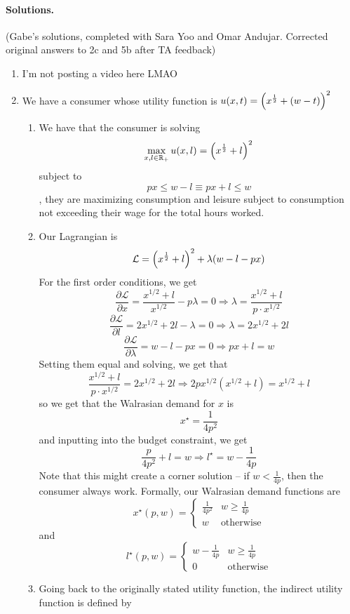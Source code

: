 \documentclass[12pt]{article}
\begin{document}
\paragraph{Solutions.} (Gabe's solutions, completed with Sara Yoo and Omar Andujar. Corrected original answers to 2c and 5b after TA feedback)
\begin{enumerate}
	\item I'm not posting a video here LMAO
	\item We have a consumer whose utility function is $u(x,t) = \left( x^{\frac{1}{2}} + (w - t)\right)^2$
	\begin{enumerate}
		\item We have that the consumer is solving
		\[
		\max_{x,l \in \mathbb{R}_{+}} u(x,l) = \left( x^{\frac{1}{2}} + l\right)^2
		\]
		subject to
		\[
		px \le w - l \equiv px + l \le w
		\]
		\ie, they are maximizing consumption and leisure subject to consumption not exceeding their wage for the total hours worked.
		\item Our Lagrangian is
		\[
		\mathcal{L} = \left( x^{\frac{1}{2}} + l\right)^2 + \lambda(w - l - px)
		\]
		For the first order conditions, we get
		\[
		\frac{\partial \mathcal{L}}{\partial x} = \frac{x^{1/2} + l}{x^{1/2}} - p\lambda = 0 \Longrightarrow \lambda = \frac{x^{1/2} + l}{p\cdot x^{1/2}}
		\]
		\[
		\frac{\partial \mathcal{L}}{\partial l} = 2x^{1/2} + 2l - \lambda = 0 \Longrightarrow \lambda = 2x^{1/2} + 2l
		\]
		\[
		\frac{\partial \mathcal{L}}{\partial \lambda} = w - l - px = 0 \Longrightarrow  px+ l = w
		\]
		Setting them equal and solving, we get that
		\[
		\frac{x^{1/2} + l}{p\cdot x^{1/2}} = 2x^{1/2} + 2l \Longrightarrow 2px^{1/2}(x^{1/2} + l) = x^{1/2} + l
		\]
		so we get that the Walrasian demand for $x$ is
		\[
		x^\star = \frac{1}{4p^2}
		\]
		and inputting into the budget constraint, we get
		\[
		\frac{p}{4p^2} + l = w \Longrightarrow l^\star = w - \frac{1}{4p}
		\]
		Note that this might create a corner solution -- if $w < \frac{1}{4p}$, then the consumer always work. Formally, our Walrasian demand functions are
		\[
		x^\star(p,w) = \begin{cases} \frac{1}{4p^2} & w \ge \frac{1}{4p} \\ w & \text{otherwise} \end{cases}
		\]
		and
		\[
		l^\star(p,w) = \begin{cases} w - \frac{1}{4p} & w \ge \frac{1}{4p} \\ 0 & \text{otherwise} \end{cases}
		\]
		\item Going back to the originally stated utility function, the indirect utility function is defined by

\end{enumerate}
\end{enumerate}
\end{document}
